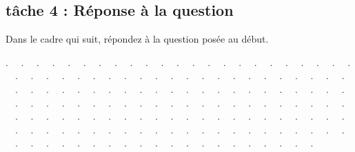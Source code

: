 \documentclass[12pt,a4paper,notitlepage]{article}
\begin{document}
\subsection*{tâche 4 : Réponse à la question}
Dans le cadre qui suit, répondez à la question posée au début.
\begin{bclogo}[couleur=yellow!5, arrondi=0.1, logo=\bccrayon, nobreak=true]{}

\noindent . \ \ . \ \ . \ \ . \ \ . \ \ . \ \ . \ \ . \ \ . \ \ . \ \ . \ \ . \ \ .
\ \ . \ \ . \ \ . \ \ . \ \ . \ \ . \ \ . \ \ . \ \ . \ \ . \ \ . \ \ . \ \ . \ \ . 
\ \ . \ \ . \ \ . \ \ . \ \ . \ \ . \ \ . \ \ . \ \ . \ \ . \ \ . \ \ . \ \ . \ \ . 
\ \ . \ \ . \ \ . \ \ . \ \ . \ \ . \ \ . \ \ . \ \ . \ \ . \ \ . \ \ . \ \ . \ \ . 
\ \ . \ \ . \ \ . \ \ . \ \ . \ \ . \ \ . \ \ . \ \ . \ \ . \ \ . \ \ . \ \ . \ \ . 
\ \ . \ \ . \ \ . \ \ . \ \ . \ \ . \ \ . \ \ . \ \ . \ \ . \ \ . \ \ . \ \ . \ \ . 
\ \ . \ \ . \ \ . \ \ . \ \ . \ \ . \ \ . \ \ . \ \ . \ \ . \ \ . \ \ . \ \ . \ \ . 
\ \ . \ \ . \ \ . \ \ . \ \ . \ \ . \ \ . \ \ . \ \ . \ \ . \ \ . \ \ . \ \ . \ \ . 
\ \ . \ \ . \ \ . \ \ . \ \ . \ \ . \ \ . \ \ . \ \ . \ \ . \ \ . \ \ . \ \ . \ \ . 
\ \ . \ \ . \ \ . \ \ . \ \ . \ \ . \ \ . \ \ . \ \ . \ \ . \ \ . \ \ . \ \ . \ \ . 
\ \ . \ \ . \ \ . \ \ . \ \ . \ \ . \ \ . \ \ . \ \ . \ \ . \ \ . \ \ . \ \ . \ \ . 

\end{bclogo}
\end{document}
